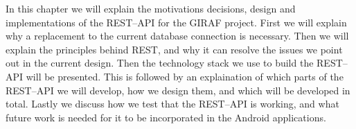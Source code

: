 In this chapter we will explain the motivations decisions, design and implementations of the REST--API for the GIRAF project.
First we will explain why a replacement to the current database connection is necessary.
Then we will explain the principles behind REST, and why it can resolve the issues we point out in the current design.
Then the technology stack we use to build the REST--API will be presented.
This is followed by an explaination of which parts of the REST--API we will develop, how we design them, and which will be developed in total.
Lastly we discuss how we test that the REST--API is working, and what future work is needed for it to be incorporated in the Android applications.
